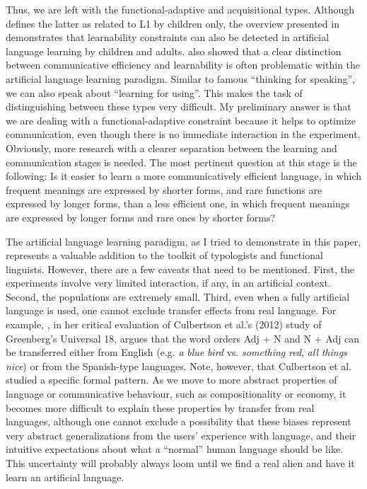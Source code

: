 \documentclass[output=paper]{langsci/langscibook}
\begin{document}
Thus, we are left with the functional-adaptive and acquisitional types. Although  defines the latter as related to L1 by children only, the overview presented in  demonstrates that learnability constraints can also be detected in artificial language learning by children and adults.  also showed that a clear distinction between communicative efficiency and learnability is often problematic within the artificial language learning paradigm. Similar to  famous “thinking for speaking”, we can also speak about “learning for using”. This makes the task of distinguishing between these types very difficult. My preliminary answer is that we are dealing with a functional-adaptive constraint because it helps to optimize communication, even though there is no immediate interaction in the experiment. Obviously, more research with a clearer separation between the learning and communication stages is needed. The most pertinent question at this stage is the following: Is it easier to learn a more communicatively efficient language, in which frequent meanings are expressed by shorter forms, and rare functions are expressed by longer forms, than a less efficient one, in which frequent meanings are expressed by longer forms and rare ones by shorter forms?

The artificial language learning paradigm, as I tried to demonstrate in this paper, represents a valuable addition to the toolkit of typologists and functional linguists. However, there are a few caveats that need to be mentioned. First, the experiments involve very limited interaction, if any, in an artificial context. Second, the populations are extremely small. Third, even when a fully artificial language is used, one cannot exclude transfer effects from real language. For example, \citet{Goldberg2013}, in her critical evaluation of Culbertson et al.’s (2012) study of Greenberg’s Universal 18, argues that the word orders Adj + N and N + Adj can be transferred either from English (e.g. \textit{a} \textit{blue} \textit{bird} vs. \textit{something} \textit{red}, \textit{all} \textit{things} \textit{nice}) or from the Spanish-type languages. Note, however, that Culbertson et al. studied a specific formal pattern. As we move to more abstract properties of language or communicative behaviour, such as compositionality or economy, it becomes more difficult to explain these properties by transfer from real languages, although one cannot exclude a possibility that these biases represent very abstract generalizations from the users’ experience with language, and their intuitive expectations about what a “normal” human language should be like. This uncertainty will probably always loom until we find a real alien and have it learn an artificial language. 
\end{document}
